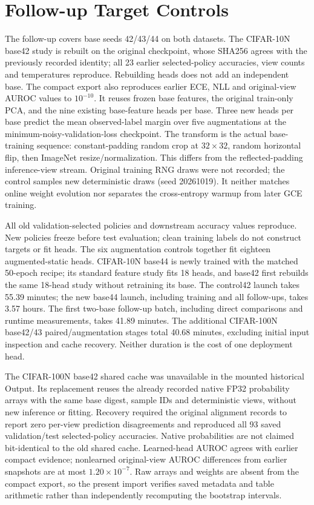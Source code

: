 \clearpage
\section{Follow-up Target Controls}
\label{app:followup_controls}
The follow-up covers base seeds 42/43/44 on both datasets. The CIFAR-10N base42 study is rebuilt on the original checkpoint, whose SHA256 agrees with the previously recorded identity; all 23 earlier selected-policy accuracies, view counts and temperatures reproduce. Rebuilding heads does not add an independent base. The compact export also reproduces earlier ECE, NLL and original-view AUROC values to $10^{-10}$. It reuses frozen base features, the original train-only PCA, and the nine existing base-feature heads per base. Three new heads per base predict the mean observed-label margin over five augmentations at the minimum-noisy-validation-loss checkpoint. The transform is the actual base-training sequence: constant-padding random crop at $32\times32$, random horizontal flip, then ImageNet resize/normalization. This differs from the reflected-padding inference-view stream. Original training RNG draws were not recorded; the control samples new deterministic draws (seed 20261019). It neither matches online weight evolution nor separates the cross-entropy warmup from later GCE training.

All old validation-selected policies and downstream accuracy values reproduce. New policies freeze before test evaluation; clean training labels do not construct targets or fit heads. The six augmentation controls together fit eighteen augmented-static heads. CIFAR-10N base44 is newly trained with the matched 50-epoch recipe; its standard feature study fits 18 heads, and base42 first rebuilds the same 18-head study without retraining its base. The control42 launch takes 55.39 minutes; the new base44 launch, including training and all follow-ups, takes 3.57 hours. The first two-base follow-up batch, including direct comparisons and runtime measurements, takes 41.89 minutes. The additional CIFAR-100N base42/43 paired/augmentation stages total 40.68 minutes, excluding initial input inspection and cache recovery. Neither duration is the cost of one deployment head.

The CIFAR-100N base42 shared cache was unavailable in the mounted historical Output. Its replacement reuses the already recorded native FP32 probability arrays with the same base digest, sample IDs and deterministic views, without new inference or fitting. Recovery required the original alignment records to report zero per-view prediction disagreements and reproduced all 93 saved validation/test selected-policy accuracies. Native probabilities are not claimed bit-identical to the old shared cache. Learned-head AUROC agrees with earlier compact evidence; nonlearned original-view AUROC differences from earlier snapshots are at most $1.20\times10^{-7}$. Raw arrays and weights are absent from the compact export, so the present import verifies saved metadata and table arithmetic rather than independently recomputing the bootstrap intervals.

